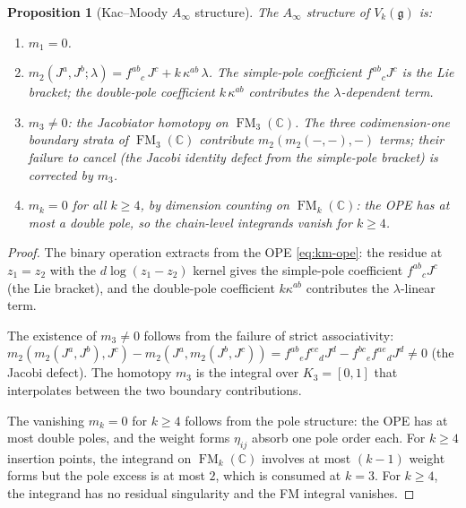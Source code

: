 \documentclass[11pt,reqno]{amsart}
\newtheorem{proposition}[theorem]{Proposition}
\theoremstyle{definition}
\theoremstyle{remark}
\newcommand{\CC}{\mathbb{C}}
\newcommand{\fg}{\mathfrak{g}}
\newcommand{\Ainf}{A_{\infty}}
\DeclareMathOperator{\FM}{FM}
\numberwithin{equation}{section}
\providecommand{\ClaimStatusProvedHere}{}
\begin{document}
\begin{proposition}[Kac--Moody $\Ainf$ structure]
\label{prop:km-ainf}
\ClaimStatusProvedHere{}
The $\Ainf$ structure of $V_k(\fg)$ is:
\begin{enumerate}[label=(\roman*)]
\item $m_1 = 0$.
\item $m_2(J^a, J^b; \lambda) = f^{ab}{}_c\, J^c + k\,\kappa^{ab}\,\lambda$.
  The simple-pole coefficient $f^{ab}{}_c J^c$ is the Lie bracket;
  the double-pole coefficient $k\,\kappa^{ab}$ contributes the
  $\lambda$-dependent term.
\item $m_3 \neq 0$: the Jacobiator homotopy on $\FM_3(\CC)$.
  The three codimension-one boundary strata of $\FM_3(\CC)$
  contribute $m_2(m_2(-,-),-)$ terms; their failure to cancel
  (the Jacobi identity defect from the simple-pole bracket) is
  corrected by $m_3$.
\item $m_k = 0$ for all $k \geq 4$, by dimension counting on
  $\FM_k(\CC)$: the OPE has at most a double pole, so the
  chain-level integrands vanish for $k \geq 4$.
\end{enumerate}
\end{proposition}

\begin{proof}
The binary operation extracts from the OPE
\eqref{eq:km-ope}: the residue at $z_1 = z_2$ with the
$d\log(z_1 - z_2)$ kernel gives the simple-pole coefficient
$f^{ab}{}_c J^c$ (the Lie bracket), and the double-pole
coefficient $k\kappa^{ab}$ contributes the $\lambda$-linear
term.

The existence of $m_3 \neq 0$ follows from the failure of
strict associativity: $m_2(m_2(J^a, J^b), J^c) -
m_2(J^a, m_2(J^b, J^c)) = f^{ab}{}_e f^{ec}{}_d J^d -
f^{bc}{}_e f^{ae}{}_d J^d \neq 0$ (the Jacobi defect).  The
homotopy $m_3$ is the integral over $K_3 = [0,1]$ that
interpolates between the two boundary contributions.

The vanishing $m_k = 0$ for $k \geq 4$ follows from the pole
structure: the OPE has at most double poles, and the weight
forms $\eta_{ij}$ absorb one pole order each.  For $k \geq 4$
insertion points, the integrand on $\FM_k(\CC)$ involves at most
$(k-1)$ weight forms but the pole excess is at most $2$, which
is consumed at $k = 3$.  For $k \geq 4$, the integrand has no
residual singularity and the FM integral vanishes.
\end{proof}
\end{document}
